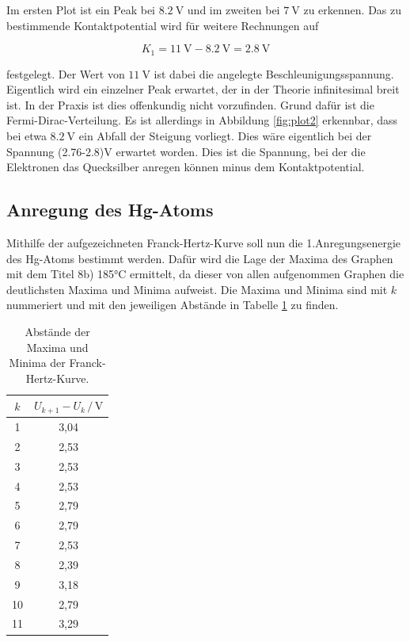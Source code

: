 Im ersten Plot ist ein Peak bei $\SI{8.2}{\volt}$ und im zweiten bei $\SI{7}{\volt}$ zu erkennen. 
Das zu bestimmende Kontaktpotential wird für weitere Rechnungen auf 

\begin{equation*}
K_1 = \SI{11}{\volt}-\SI{8.2}{\volt} = \SI{2.8}{\volt}
\end{equation*}

festgelegt. Der Wert von $\SI{11}{\volt}$ ist dabei die angelegte Beschleunigungsspannung.
Eigentlich wird ein einzelner Peak erwartet, der in der Theorie infinitesimal breit ist. In der Praxis 
ist dies offenkundig nicht vorzufinden. Grund dafür ist die Fermi-Dirac-Verteilung. 
Es ist allerdings in Abbildung \ref{fig:plot2} erkennbar, dass bei etwa $\SI{8.2}{\volt}$ ein Abfall der 
Steigung vorliegt. Dies wäre eigentlich bei der Spannung (2.76-2.8)V erwartet worden. Dies ist die Spannung, 
bei der die Elektronen das Quecksilber anregen können minus dem Kontaktpotential. 

\subsection{Anregung des Hg-Atoms}

Mithilfe der aufgezeichneten Franck-Hertz-Kurve soll nun die 1.Anregungsenergie des Hg-Atoms bestimmt 
werden. Dafür wird die Lage der Maxima des Graphen mit dem Titel 8b) 185°C ermittelt, da dieser von
allen aufgenommen Graphen die deutlichsten Maxima und Minima aufweist. Die Maxima und Minima sind mit $k$
nummeriert und mit den jeweiligen Abstände in Tabelle \ref{tab:Max} zu finden. 

\begin{table}
  \centering
  \caption{Abstände der Maxima und Minima der Franck-Hertz-Kurve.}
  \label{tab:Max}
  \begin{tabular}{c c}
  \toprule
  $k$ & $U_{k+1}-U_{k} \,/\, \si{\volt}$\\
  \midrule 
   1 & 3,04\\
   2 & 2,53\\
   3 & 2,53\\
   4 & 2,53\\
   5 & 2,79\\
   6 & 2,79\\
   7 & 2,53\\
   8 & 2,39\\
   9 & 3,18\\
  10 & 2,79\\
  11 & 3,29\\
  \bottomrule
  \end{tabular}
  \end{table}

